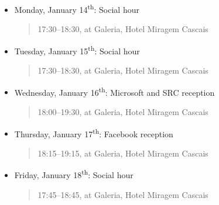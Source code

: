 
\label{Socials}

\begin{itemize}
\item Monday, January 14\textsuperscript{th}: Social hour
      \begin{quote}
        17:30--18:30, at Galeria, Hotel Miragem Cascais
      \end{quote}
\item Tuesday, January 15\textsuperscript{th}: Social hour
      \begin{quote}
        17:30--18:30, at Galeria, Hotel Miragem Cascais
      \end{quote}
\item Wednesday, January 16\textsuperscript{th}: Microsoft and SRC reception
      \begin{quote}
        18:00--19:30, at Galeria, Hotel Miragem Cascais
      \end{quote}
\item Thursday, January 17\textsuperscript{th}: Facebook reception
      \begin{quote}
        18:15--19:15, at Galeria, Hotel Miragem Cascais
      \end{quote}
\item Friday, January 18\textsuperscript{th}: Social hour
      \begin{quote}
        17:45--18:45, at Galeria, Hotel Miragem Cascais
      \end{quote}
\end{itemize}





\newpage
